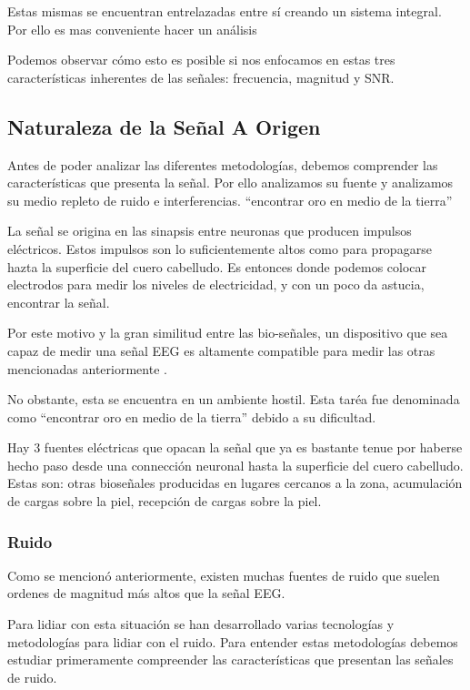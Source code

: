 Estas mismas se encuentran entrelazadas entre sí creando un sistema integral. Por ello es mas conveniente hacer un análisis

Podemos observar cómo esto es posible si nos enfocamos en estas tres características inherentes de las señales: frecuencia, magnitud y SNR.

\subsection{Naturaleza de la Señal A Origen}
\label{sec:org2944181}
Antes de poder analizar las diferentes metodologías, debemos comprender las características que presenta la señal. Por ello analizamos su fuente y analizamos su medio repleto de ruido e interferencias. “encontrar oro en medio de la tierra”

La señal se origina en las sinapsis entre neuronas que producen impulsos eléctricos. Estos impulsos son lo suficientemente altos como para propagarse hazta la superficie del cuero cabelludo. Es entonces donde podemos colocar electrodos para medir los niveles de electricidad, y con un poco da astucia, encontrar la señal.

Por este motivo y la gran similitud entre las bio-señales, un dispositivo que sea capaz de medir una señal EEG es altamente compatible para medir las otras mencionadas anteriormente \cite{Ahamed2015}.

No obstante, esta se encuentra en un ambiente hostil. Esta taréa fue denominada como “encontrar oro en medio de la tierra” debido a su dificultad.

Hay 3 fuentes eléctricas que opacan la señal que ya es bastante tenue por haberse hecho paso desde una connección neuronal hasta la superficie del cuero cabelludo. Estas son: otras bioseñales producidas en lugares cercanos a la zona, acumulación de cargas sobre la piel, recepción de cargas sobre la piel.

\subsubsection{Ruido}
\label{sec:org7ef8925}
Como se mencionó anteriormente, existen muchas fuentes de ruido que suelen ordenes de magnitud más altos que la señal EEG.

Para lidiar con esta situación se han desarrollado varias tecnologías y metodologías para lidiar con el ruido. Para entender estas metodologías debemos estudiar primeramente compreender las características que presentan las señales de ruido.

